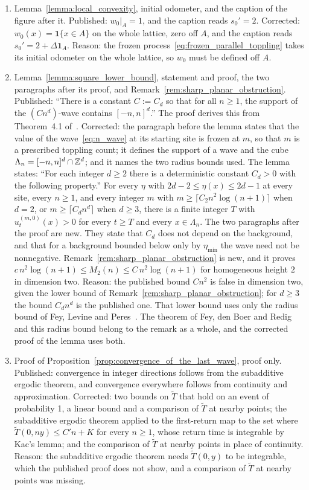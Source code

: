 \documentclass[12pt]{amsart}
\begin{document}
\begin{enumerate}
\item[C07.] Lemma~\ref{lemma:local_convexity}, initial odometer, and the caption of the figure after it. Published: $w_0|_A=1$, and the caption reads $s_0'=2$. Corrected: $w_0(x)=\mathbf 1\{x\in A\}$ on the whole lattice, zero off $A$, and the caption reads $s_0'=2+\Delta\mathbf 1_A$. Reason: the frozen process~\eqref{eq:frozen_parallel_toppling} takes its initial odometer on the whole lattice, so $w_0$ must be defined off $A$.
\item[C08.] Lemma~\ref{lemma:square_lower_bound}, statement and proof, the two paragraphs after its proof, and Remark~\ref{rem:sharp_planar_obstruction}. Published: ``There is a constant $C:=C_d$ so that for all $n\geq1$, the support of the $(Cn^d)$-wave contains $[-n,n]^d$.'' The proof derives this from Theorem~4.1 of~\cite{fey2008limiting}. Corrected: the paragraph before the lemma states that the value of the wave~\eqref{eq:n_wave} at its starting site is frozen at $m$, so that $m$ is a prescribed toppling count; it defines the support of a wave and the cube $\Lambda_n=[-n,n]^d\cap\mathbb{Z}^d$; and it names the two radius bounds used. The lemma states: ``For each integer $d\geq2$ there is a deterministic constant $C_d>0$ with the following property.'' For every $\eta$ with $2d-2\leq\eta(x)\leq2d-1$ at every site, every $n\geq1$, and every integer $m$ with $m\geq\lceil C_2n^2\log(n+1)\rceil$ when $d=2$, or $m\geq\lceil C_dn^d\rceil$ when $d\geq3$, there is a finite integer $T$ with $u_t^{(m,0)}(x)>0$ for every $t\geq T$ and every $x\in\Lambda_n$. The two paragraphs after the proof are new. They state that $C_d$ does not depend on the background, and that for a background bounded below only by $\eta_{\min}$ the wave need not be nonnegative. Remark~\ref{rem:sharp_planar_obstruction} is new, and it proves $c\,n^2\log(n+1)\leq M_2(n)\leq C\,n^2\log(n+1)$ for homogeneous height $2$ in dimension two. Reason: the published bound $Cn^2$ is false in dimension two, given the lower bound of Remark~\ref{rem:sharp_planar_obstruction}; for $d\geq3$ the bound $C_dn^d$ is the published one. That lower bound uses only the radius bound of Fey, Levine and Peres~\cite{fey2010growth}. The theorem of Fey, den Boer and Redig~\cite{fey2008limiting} and this radius bound belong to the remark as a whole, and the corrected proof of the lemma uses both.
\item[C09.] Proof of Proposition~\ref{prop:convergence_of_the_last_wave}, proof only. Published: convergence in integer directions follows from the subadditive ergodic theorem, and convergence everywhere follows from continuity and approximation. Corrected: two bounds on $\tilde T$ that hold on an event of probability 1, a linear bound and a comparison of $\tilde T$ at nearby points; the subadditive ergodic theorem applied to the first-return map to the set where $\tilde T(0,ny)\leq C'n+K$ for every $n\geq1$, whose return time is integrable by Kac's lemma; and the comparison of $\tilde T$ at nearby points in place of continuity. Reason: the subadditive ergodic theorem needs $\tilde T(0,y)$ to be integrable, which the published proof does not show, and a comparison of $\tilde T$ at nearby points was missing.

\end{enumerate}
\end{document}
